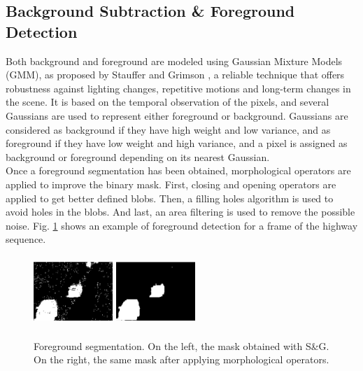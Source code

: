 \subsection{Background Subtraction \& Foreground Detection}
\label{sec:bg_fg}
Both background and foreground are modeled using Gaussian Mixture Models (GMM), as proposed by Stauffer and Grimson \cite{stauffer1999adaptive}, a reliable technique that offers robustness against lighting changes, repetitive motions and long-term changes in the scene. It is based on the temporal observation of the pixels, and several Gaussians are used to represent either foreground or background. Gaussians are considered as background if they have high weight and low variance, and as foreground if they have low weight and high variance, and a pixel is assigned as background or foreground depending on its nearest Gaussian. \\

\noindent Once a foreground segmentation has been obtained, morphological operators are applied to improve the binary mask. First, closing and opening operators are applied to get better defined blobs. Then, a filling holes algorithm is used to avoid holes in the blobs. And last, an area filtering is used to remove the possible noise. Fig. \ref{fig:fg} shows an example of foreground detection for a frame of the highway sequence. 

\begin{figure}[h]
\centering
\includegraphics[width=85pt, height=75pt]{figures/fg_mask.png} 
\includegraphics[width=85pt, height=75pt]{figures/fg_mask_mo.png} 
\caption{Foreground segmentation. On the left, the mask obtained with S\&G. On the right, the same mask after applying morphological operators.}
\label{fig:fg}
\end{figure}

